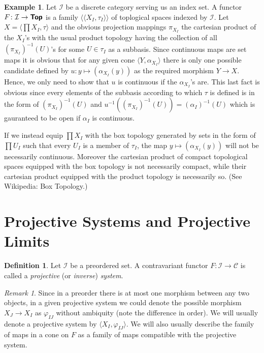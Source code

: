 \documentclass[12pt]{article}
\theoremstyle{definition}
\newtheorem{dfn}[thm]{Definition}
\newtheorem{exm}[thm]{Example}
\theoremstyle{remark}
\newtheorem{rem}[thm]{Remark}
\newcommand{\catvar}[1]{\mathcal{#1}}
\newcommand{\CC}{\catvar{C}}
\newcommand{\II}{\catvar{I}}
\newcommand{\catname}[1]{\textup{\sffamily\textbf{#1}}}
\newcommand*{\Top}{\catname{Top}}
\begin{document}
    \begin{exm}
        Let $\II$ be a discrete category serving us an index set. A functor $F\colon\II\to\Top$ is a family $\big\langle\langle X_I,\tau_I\rangle\big\rangle$ of toplogical spaces indexed by $\II$. Let $X=\langle\prod X_I,\tau\rangle$ and the obvious projection mappings $\pi_{X_I}$ the cartesian product of the $X_I$'s with the usual product topology having the collection of all $(\pi_{X_I})^{-1}(U)$'s for some $U\in\tau_I$ as a subbasis. Since continuous maps are set maps it is obvious that for any given cone $\langle Y,\alpha_{X_I}\rangle$ there is only one possible candidate defined by $u\colon y\mapsto (\alpha_{X_I}(y))$ as the required morphism $Y\to X$. Hence, we only need to show that $u$ is continuous if the $\alpha_{X_I}$'s are. This last fact is obvious since every elements of the subbasis according to which $\tau$ is defined is in the form of $(\pi_{X_I})^{-1}(U)$ and $u^{-1}((\pi_{X_I})^{-1}(U))=(\alpha_I)^{-1}(U)$ which is gauranteed to be open if $\alpha_I$ is continuous.

        If we instead equip $\prod X_I$ with the box topology generated by sets in the form of $\prod U_I$ such that every $U_I$ is a member of $\tau_I$, the map $y\mapsto (\alpha_{X_I}(y))$ will not be necessarily continuous. Moreover the cartesian product of compact topological spaces equipped with the box topology is not necessarily compact, while their cartesian product equipped with the product topology is necessarily so. (See Wikipedia: Box Topology.)
    \end{exm}

    \section{Projective Systems and Projective Limits}

    \begin{dfn}
        Let $\II$ be a preordered set. A contravariant functor $F\colon\II\to\CC$ is called a \emph{projective} (or \emph{inverse}) \emph{system}.
    \end{dfn}

    \begin{rem}
         Since in a preorder there is at most one morphism between any two objects, in a given projective system we could denote the possible morphism $X_J\to X_I$ as $\varphi_{IJ}$ without ambiquity (note the difference in order). We will usually denote a projective system by $\langle X_I,\varphi_{IJ}\rangle$. We will also usually describe the family of maps in a cone on $F$ as a family of maps compatible with the projective system.
    \end{rem}
\end{document}
